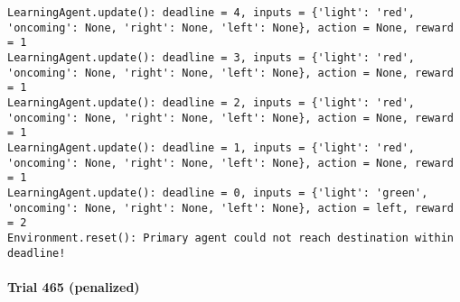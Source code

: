 \documentclass{article}
\begin{document}
\begin{verbatim}
LearningAgent.update(): deadline = 4, inputs = {'light': 'red', 'oncoming': None, 'right': None, 'left': None}, action = None, reward = 1
LearningAgent.update(): deadline = 3, inputs = {'light': 'red', 'oncoming': None, 'right': None, 'left': None}, action = None, reward = 1
LearningAgent.update(): deadline = 2, inputs = {'light': 'red', 'oncoming': None, 'right': None, 'left': None}, action = None, reward = 1
LearningAgent.update(): deadline = 1, inputs = {'light': 'red', 'oncoming': None, 'right': None, 'left': None}, action = None, reward = 1
LearningAgent.update(): deadline = 0, inputs = {'light': 'green', 'oncoming': None, 'right': None, 'left': None}, action = left, reward = 2
Environment.reset(): Primary agent could not reach destination within deadline!
\end{verbatim}

\paragraph{Trial 465 (penalized)}\label{trial-465-penalized}
\end{document}

